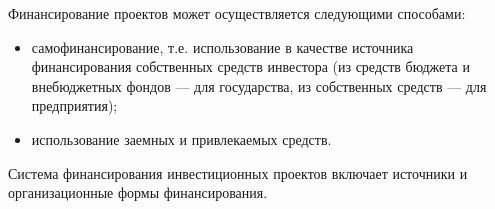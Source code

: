 Финансирование проектов может осуществляется следующими
способами:
\begin{itemize}
	\item самофинансирование, т.е. использование в качестве источника финансирования собственных средств инвестора (из средств бюджета и внебюджетных фондов --- для государства, из собственных средств --- для предприятия);
\item использование заемных и привлекаемых средств.
\end{itemize}

Система финансирования инвестиционных проектов включает источники и организационные формы финансирования.








